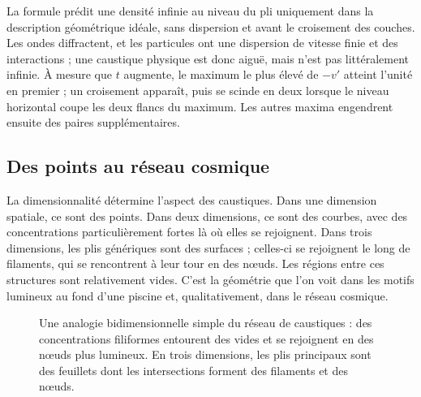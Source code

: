 La formule prédit une densité infinie au niveau du pli uniquement dans la description géométrique idéale, sans dispersion et avant le croisement des couches. Les ondes diffractent, et les particules ont une dispersion de vitesse finie et des interactions ; une caustique physique est donc aiguë, mais n’est pas littéralement infinie. À mesure que \(t\) augmente, le maximum le plus élevé de \(-v'\) atteint l’unité en premier ; un croisement apparaît, puis se scinde en deux lorsque le niveau horizontal coupe les deux flancs du maximum. Les autres maxima engendrent ensuite des paires supplémentaires.

\subsection{Des points au réseau cosmique}

La dimensionnalité détermine l’aspect des caustiques. Dans une dimension spatiale, ce sont des points. Dans deux dimensions, ce sont des courbes, avec des concentrations particulièrement fortes là où elles se rejoignent. Dans trois dimensions, les plis génériques sont des surfaces ; celles-ci se rejoignent le long de filaments, qui se rencontrent à leur tour en des nœuds. Les régions entre ces structures sont relativement vides. C’est la géométrie que l’on voit dans les motifs lumineux au fond d’une piscine et, qualitativement, dans le réseau cosmique.

\begin{figure}[htbp]
\centering
{}
\caption{Une analogie bidimensionnelle simple du réseau de caustiques : des concentrations filiformes entourent des vides et se rejoignent en des nœuds plus lumineux. En trois dimensions, les plis principaux sont des feuillets dont les intersections forment des filaments et des nœuds.}
\label{fig:c09-caustic-network}
\end{figure}

